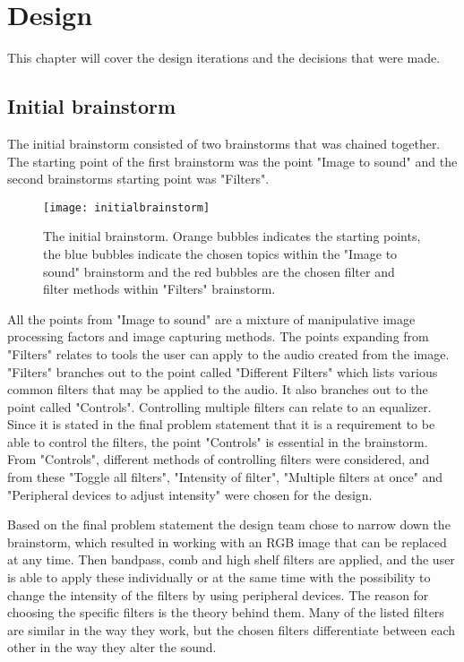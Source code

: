 \chapter{Design}\label{ch:design}
This chapter will cover the design iterations and the decisions that were made. 

\section{Initial brainstorm}\label{sec:initialbrianstom}
The initial brainstorm consisted of two brainstorms that was chained together. The starting point of the first brainstorm was the point "Image to sound" and the second brainstorms starting point was "Filters". 

\begin{figure}[!h] 
\centering
\texttt{[image: initialbrainstorm]}
\caption{\label{fig:initialbrainstorm} The initial brainstorm. Orange bubbles indicates the starting points, the blue bubbles indicate the chosen topics within the "Image to sound" brainstorm and the red bubbles are the chosen filter and filter methods within "Filters" brainstorm.}
\end{figure}

All the points from "Image to sound" are a mixture of manipulative image processing factors and image capturing methods. 
The points expanding from "Filters" relates to tools the user can apply to the audio created from the image. 
"Filters" branches out to the point called "Different Filters" which lists various common filters that may be applied to the audio. It also branches out to the point called "Controls". Controlling multiple filters can relate to an equalizer. 
Since it is stated in the final problem statement that it is a requirement to be able to control the filters, the point "Controls" is essential in the brainstorm. From "Controls", different methods of controlling filters were considered, and from these "Toggle all filters", "Intensity of filter", "Multiple filters at once" and "Peripheral devices to adjust intensity" were chosen for the design.

Based on the final problem statement the design team chose to narrow down the brainstorm, which resulted in working with an RGB image that can be replaced at any time. Then bandpass, comb and high shelf filters are applied, and the user is able to apply these individually or at the same time with the possibility to change the intensity of the filters by using peripheral devices. 
The reason for choosing the specific filters is the theory behind them. Many of the listed filters are similar in the way they work, but the chosen filters differentiate between each other in the way they alter the sound.


